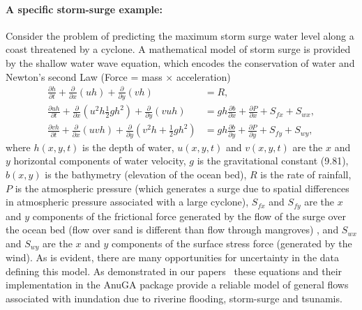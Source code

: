 \paragraph*{A specific storm-surge example:}
Consider the problem of predicting the maximum 
storm surge water level along a coast threatened by a cyclone. 
A mathematical model of storm surge is provided 
by the shallow water wave equation,  which encodes the conservation of water and Newton's second Law (Force = mass $\times$ acceleration) 
\begin{align*}
\frac{\partial h}{\partial t} +
\frac{\partial }{\partial x} \left(uh\right) + \frac{\partial }{\partial y} \left(vh\right) &= R, \\
\frac{\partial uh}{\partial t} +
\frac{\partial }{\partial x} \left(u^2h  \frac12 gh^2 \right) 
+ \frac{\partial }{\partial y} \left(vuh\right) &= gh \frac{\partial b}{\partial x} 
+ \frac{\partial P}{\partial  x} + S_{fx} + S_{wx} ,\\
\frac{\partial vh}{\partial t} +
\frac{\partial }{\partial x} \left(uvh  \right) 
+ \frac{\partial }{\partial y} \left(v^2h + \frac12 g h^2 \right) &= gh \frac{\partial b}{\partial y} 
+ \frac{\partial P}{\partial  y} + S_{fy} + S_{wy},
\end{align*}
where $h(x,y,t)$ is the depth of water, $u(x,y,t)$ and $v(x,y,t)$ are the $x$ and $y$ horizontal components of water velocity, $g$ is the gravitational constant (9.81), $b(x,y)$ is the bathymetry (elevation of the ocean bed), $R$ is the rate of rainfall, $P$ is the atmospheric pressure (which generates a surge due to spatial differences in atmospheric pressure associated with a large cyclone), $S_{fx}$ and $S_{fy}$ are the $x$ and $y$ components of the frictional force generated by the flow of the surge over the ocean bed (flow over sand is different than flow through mangroves) , and $S_{wx}$ and $S_{wy}$ are the $x$ and $y$ components of the surface stress force (generated by the wind). As is evident, there are many opportunities for uncertainty in the data defining this model. 
As demonstrated in our papers~\parencite{anugamanual,nielsen2005hydrodynamic}  these
equations and their implementation in the AnuGA package provide a reliable
model of general flows associated with inundation due to riverine flooding, storm-surge 
and tsunamis.

